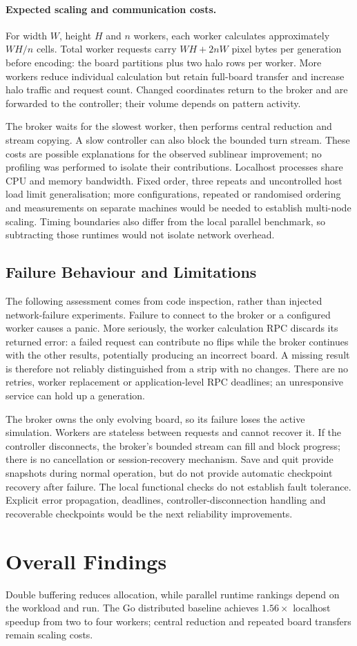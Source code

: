 \documentclass[10pt,a4paper,twocolumn]{article}
\begin{document}
\paragraph{Expected scaling and communication costs.}
For width $W$, height $H$ and $n$ workers, each worker calculates approximately
$WH/n$ cells. Total worker requests carry $WH+2nW$ pixel bytes per generation
before encoding: the board partitions plus two halo rows per worker.
More workers reduce individual calculation but retain full-board transfer
and increase halo traffic and request count. Changed coordinates return to
the broker and are forwarded to the controller; their volume depends on
pattern activity.

The broker waits for the slowest worker, then performs central reduction
and stream copying. A slow controller can also block the bounded turn stream.
These costs are possible explanations for the observed sublinear improvement;
no profiling was performed to isolate their contributions. Localhost processes
share CPU and memory bandwidth. Fixed order, three repeats and uncontrolled
host load limit generalisation; more configurations, repeated or randomised
ordering and measurements on separate machines would be needed to establish
multi-node scaling. Timing boundaries also differ from the local parallel
benchmark, so subtracting those runtimes would not isolate network overhead.

\subsection{Failure Behaviour and Limitations}

The following assessment comes from code inspection, rather than injected
network-failure experiments. Failure to connect to the broker or a configured
worker causes a panic. More seriously, the worker calculation RPC discards
its returned error: a failed request can contribute no flips while the broker
continues with the other results, potentially producing an incorrect board.
A missing result is therefore not reliably distinguished from a strip with
no changes. There are no retries, worker replacement or application-level
RPC deadlines; an unresponsive service can hold up a generation.

The broker owns the only evolving board, so its failure loses the active
simulation. Workers are stateless between requests and cannot recover it.
If the controller disconnects, the broker's bounded stream can fill and
block progress; there is no cancellation or session-recovery mechanism.
Save and quit provide snapshots during normal operation, but do not provide
automatic checkpoint recovery after failure. The local functional checks do
not establish fault tolerance. Explicit error propagation, deadlines,
controller-disconnection handling and recoverable checkpoints would be the
next reliability improvements.

\section{Overall Findings}

Double buffering reduces allocation, while parallel runtime rankings depend
on the workload and run. The Go distributed baseline achieves $1.56\times$
localhost speedup from two to four workers; central reduction and repeated
board transfers remain scaling costs.
\end{document}
